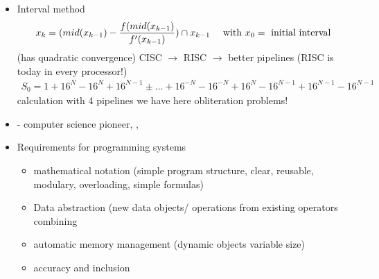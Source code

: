 \begin{itemize}
	\item Interval  method
	\begin{align*}
		x_k=(mid(x_{k-1})-\frac{f(mid(x_{k-1})}{f'(x_{k-1})})\cap x_{k-1} \quad \text{ with } x_0 = \text{ initial interval} 
	\end{align*}
	(has quadratic convergence)
	\newline CISC $\to$ RISC $\to$ better pipelines (RISC is today in every processor!)
	\begin{align*}
		S_0=1+16^N-16^N+16^{N-1}\pm \dots +16^{-N}-16^{-N}+16^N-16^{N-1}+16^{N-1}-16^{N-1}
	\end{align*}
	calculation with 4 pipelines 
	we have here obliteration problems!
	\item {} - computer science pioneer, ,  
	\item Requirements for programming systems
	\begin{itemize}
		\item mathematical notation (simple program structure, clear, reusable, modulary, overloading, simple formulas)
		\item Data abstraction (new data objects/ operations from existing operators combining
		\item automatic memory management (dynamic objects variable size)
		\item accuracy and inclusion
	\end{itemize}
\end{itemize}